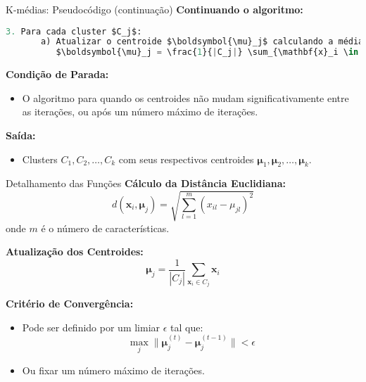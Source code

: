 \documentclass{beamer}
\begin{document}
\begin{frame}[fragile]{K-médias: Pseudocódigo (continuação)}
    \textbf{Continuando o algoritmo:}
    \begin{lstlisting}[language=Python, mathescape=true]
3. Para cada cluster $C_j$:
       a) Atualizar o centroide $\boldsymbol{\mu}_j$ calculando a média dos pontos atribuídos ao cluster:
          $\boldsymbol{\mu}_j = \frac{1}{|C_j|} \sum_{\mathbf{x}_i \in C_j} \mathbf{x}_i$
    \end{lstlisting}
    \vspace{0.3cm}
    \textbf{Condição de Parada:}
    \begin{itemize}
        \item O algoritmo para quando os centroides não mudam significativamente entre as iterações, ou após um número máximo de iterações.
    \end{itemize}
    \vspace{0.3cm}
    \textbf{Saída:}
    \begin{itemize}
        \item Clusters \( C_1, C_2, \dots, C_k \) com seus respectivos centroides \( \boldsymbol{\mu}_1, \boldsymbol{\mu}_2, \dots, \boldsymbol{\mu}_k \).
    \end{itemize}
\end{frame}



\begin{frame}[fragile]{Detalhamento das Funções}
    \textbf{Cálculo da Distância Euclidiana:}
    \begin{equation*}
    d(\mathbf{x}_i, \boldsymbol{\mu}_j) = \sqrt{\sum_{l=1}^{m} (x_{il} - \mu_{jl})^2}
    \end{equation*}
    onde \( m \) é o número de características.

    \vspace{0.5cm}

    \textbf{Atualização dos Centroides:}
    \begin{equation*}
    \boldsymbol{\mu}_j = \frac{1}{|C_j|} \sum_{\mathbf{x}_i \in C_j} \mathbf{x}_i
    \end{equation*}

    \vspace{0.5cm}

    \textbf{Critério de Convergência:}
    \begin{itemize}
        \item Pode ser definido por um limiar \( \epsilon \) tal que:
        \[
        \max_j \|\boldsymbol{\mu}_j^{(t)} - \boldsymbol{\mu}_j^{(t-1)}\| < \epsilon
        \]
        \item Ou fixar um número máximo de iterações.
    \end{itemize}
\end{frame}
\end{document}
